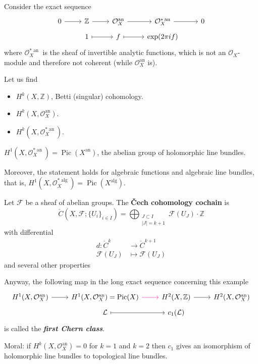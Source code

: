 \documentclass{article}
\newcommand{\Z}{\mathbb{Z}}
\newcommand{\Fc}{\mathcal{F}}
\newcommand{\Lc}{\mathcal{L}}
\newcommand{\Oc}{\mathcal{O}}
\DeclareMathOperator{\an}{an}
\DeclareMathOperator{\alg}{alg}
\DeclareMathOperator{\Pic}{Pic}
\begin{document}
\begin{example}
	Consider the exact sequence
	\[\begin{tikzcd}[row sep=tiny]
		0\arrow[r]&\Z\arrow[r]&\Oc_X^{\an}\arrow[r]&\Oc_X^{*\an}\arrow[r]&0\\
		&1\arrow[r,maps to]&f\arrow[r,maps to]&\exp(2\pi if)
	\end{tikzcd}\]
	where $\Oc_X^{*\an}$ is the sheaf of invertible analytic functions, which is not an $\Oc_X$-module and therefore not coherent (while $\Oc_X^{\an}$ is).

	Let us find
	\begin{itemize}
		\item $H^k(X,\Z)$, Betti (singular) cohomology.
		\item $H^k(X,\Oc_X^{\an})$.
		\item $H^k(X,\Oc^{*\an}_X)$.
	\end{itemize}
	\begin{claim}
		$H^1(X,\Oc_X^{*\an})=\Pic(X^{\an})$, the abelian group of holomorphic line bundles.
		
		Moreover, the statement holds for algebraic functions and algebraic line bundles, that is, $H^1(X,\Oc_X^{*\alg})=\Pic(X^{\alg})$.
	\end{claim}
	\begin{defn}
		Let $\Fc$ be a sheaf of abelian groups. The \textbf{\v Cech cohomology cochain} is
		\[\check{C}(X,\Fc;\{U_i\}_{i\in I})=\bigoplus_{\substack{J\subset I\\|J|=k+1}}\Fc(U_J)\cdot\Z\]
		with differential
		\begin{align*}
			d:\check{C}^k&\to\check{C}^{k+1}\\
			\Fc(U_J)&\mapsto \Fc(U_{J})
		\end{align*}
		and several other properties
	\end{defn}
	Anyway, the following map in the long exact sequence concerning this example
	\[\begin{tikzcd}[row sep=tiny]
		H^1(X,\Oc^{\an}_X)\arrow[r]&H^1(X,\Oc^{\an}_X)=\Pic(X)\arrow[r,magenta]&H^2(X,\Z)\arrow[r]&H^2(X,\Oc^{\an}_X)\\
		&\Lc\arrow[r,maps to]&c_1(\Lc)
	\end{tikzcd}\]
	is called the \textbf{\textit{first Chern class}}.
	
	Moral: if $H^k(X,\Oc_X^{\an})=0$ for $k=1$ and $k=2$ then $c_1$ gives an isomorphism of holomorphic line bundles to topological line bundles.
\end{example}
\end{document}
